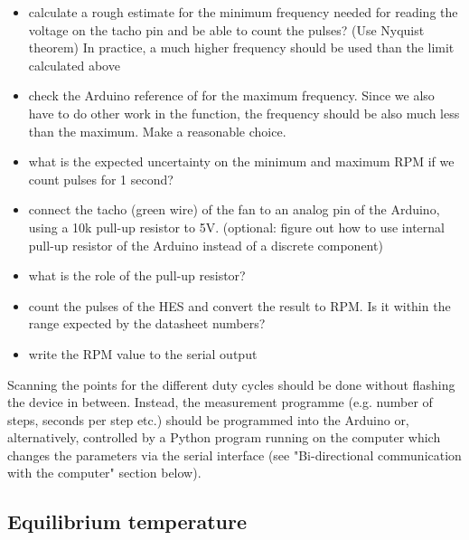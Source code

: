 \begin{itemize}
	\item calculate a rough estimate for the minimum frequency needed for reading the voltage on the tacho pin and be able to count the pulses? (Use Nyquist theorem) In practice, a much higher frequency should be used than the limit calculated above
	\item check the Arduino reference of  for the maximum frequency. Since we also have to do other work in the  function, the frequency should be also much less than the maximum. Make a reasonable choice.
    \item what is the expected uncertainty on the minimum and maximum RPM if we count pulses for 1 second?
	\item connect the tacho (green wire) of the fan to an analog pin of the Arduino, using a 10k pull-up resistor to 5V. (optional: figure out how to use internal pull-up resistor of the Arduino instead of a discrete component)
	\item what is the role of the pull-up resistor?
	\item count the pulses of the HES and convert the result to RPM. Is it within the range expected by the datasheet numbers?
	\item write the \ac{RPM} value to the serial output
\end{itemize}

\vspace{0.1cm}
\begin{center}
\end{center}
\vspace{0.5cm}

Scanning the points for the different duty cycles should be done without flashing the device in between. Instead, the measurement programme (e.g. number of steps, seconds per step etc.) should be programmed into the Arduino or, alternatively, controlled by a Python program running on the computer which changes the parameters via the serial interface (see "Bi-directional communication with the computer" section below).

\subsection{Equilibrium temperature}
\begin{center}
\end{center}
\vspace{0.5cm}

